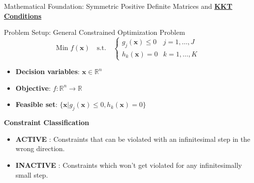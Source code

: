 \documentclass{beamer}
\begin{document}

\begin{frame}{{Mathematical Foundation: Symmetric Positive Definite Matrices and \textbf{\underline{KKT Conditions}}}}
\begin{block}{Problem Setup: General Constrained Optimization Problem}
\[
\text{Min } f(\bm{x}) \quad \text{s.t.} \quad
\begin{cases}
g_j(\bm{x}) \leq 0 & j = 1,\ldots,J \\
h_k(\bm{x}) = 0 & k = 1,\ldots,K
\end{cases}
\]

\begin{itemize}
\item \textbf{Decision variables}: $\bm{x} \in \mathbb{R}^n$
\item \textbf{Objective}: $f: \mathbb{R}^n \rightarrow \mathbb{R}$
\item \textbf{Feasible set}: $\{\bm{x} | g_j(\bm{x}) \leq 0, h_k(\bm{x}) = 0\}$
\end{itemize}
\end{block}

\textbf{Constraint Classification}
\begin{itemize}
\item \textbf{ACTIVE} : Constraints that can be violated with an infinitesimal step in the wrong direction.
\item \textbf{INACTIVE} : Constraints which won't get violated for any infinitesimally small step.
\end{itemize}
\end{frame}
\end{document}
